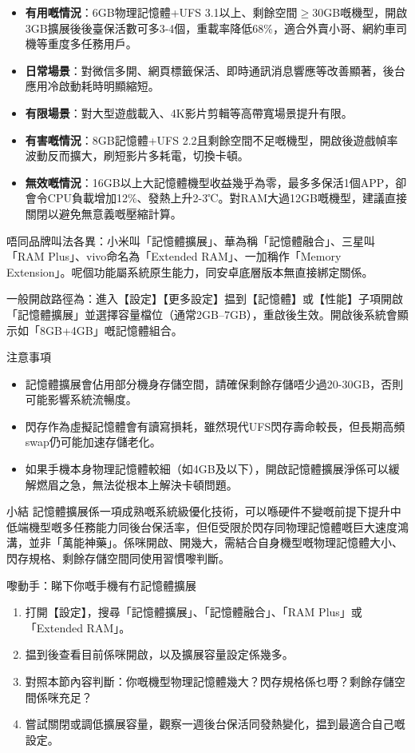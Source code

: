 \begin{itemize}
  \item \textbf{有用嘅情況}：6GB物理記憶體+UFS 3.1以上、剩餘空間$\geq$30GB嘅機型，開啟3GB擴展後後臺保活數可多3-4個，重載率降低68\%，適合外賣小哥、網約車司機等重度多任務用戶。
  \item \textbf{日常場景}：對微信多開、網頁標籤保活、即時通訊消息響應等改善顯著，後台應用冷啟動耗時明顯縮短。
  \item \textbf{有限場景}：對大型遊戲載入、4K影片剪輯等高帶寬場景提升有限。
  \item \textbf{有害嘅情況}：8GB記憶體+UFS 2.2且剩餘空間不足嘅機型，開啟後遊戲幀率波動反而擴大，刷短影片多耗電，切換卡頓。
  \item \textbf{無效嘅情況}：16GB以上大記憶體機型收益幾乎為零，最多多保活1個APP，卻會令CPU負載增加12\%、發熱上升2-3℃。對RAM大過12GB嘅機型，建議直接關閉以避免無意義嘅壓縮計算。
\end{itemize}


唔同品牌叫法各異：小米叫「記憶體擴展」、華為稱「記憶體融合」、三星叫「RAM Plus」、vivo命名為「Extended RAM」、一加稱作「Memory Extension」。呢個功能屬系統原生能力，同安卓底層版本無直接綁定關係。

一般開啟路徑為：進入【設定】【更多設定】揾到【記憶體】或【性能】子項開啟「記憶體擴展」並選擇容量檔位（通常2GB–7GB），重啟後生效。開啟後系統會顯示如「8GB+4GB」嘅記憶體組合。

\begin{tcbwarn}{注意事項}
\begin{itemize}
  \item 記憶體擴展會佔用部分機身存儲空間，請確保剩餘存儲唔少過20-30GB，否則可能影響系統流暢度。
  \item 閃存作為虛擬記憶體會有讀寫損耗，雖然現代UFS閃存壽命較長，但長期高頻swap仍可能加速存儲老化。
  \item 如果手機本身物理記憶體較細（如4GB及以下），開啟記憶體擴展淨係可以緩解燃眉之急，無法從根本上解決卡頓問題。
\end{itemize}

\end{tcbwarn}

\begin{tcbinfo}{小結}
記憶體擴展係一項成熟嘅系統級優化技術，可以喺硬件不變嘅前提下提升中低端機型嘅多任務能力同後台保活率，但佢受限於閃存同物理記憶體嘅巨大速度鴻溝，並非「萬能神藥」。係咪開啟、開幾大，需結合自身機型嘅物理記憶體大小、閃存規格、剩餘存儲空間同使用習慣嚟判斷。

\end{tcbinfo}

\begin{tcbpractice}{嚟動手：睇下你嘅手機有冇記憶體擴展}
\begin{enumerate}
  \item 打開【設定】，搜尋「記憶體擴展」、「記憶體融合」、「RAM Plus」或「Extended RAM」。
  \item 揾到後查看目前係咪開啟，以及擴展容量設定係幾多。
  \item 對照本節內容判斷：你嘅機型物理記憶體幾大？閃存規格係乜嘢？剩餘存儲空間係咪充足？
  \item 嘗試關閉或調低擴展容量，觀察一週後台保活同發熱變化，揾到最適合自己嘅設定。
\end{enumerate}

\end{tcbpractice}
